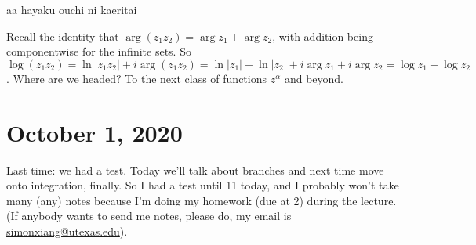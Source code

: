 aa hayaku ouchi ni kaeritai

Recall the identity that $\operatorname{arg}(z_1z_2)=\operatorname{arg}z_1+\operatorname{arg}z_2$, with addition being componentwise for the infinite sets. So $\log (z_1z_2)=\ln |z_1z_2|+i\operatorname{arg}(z_1z_2)=\ln|z_1|+\ln|z_2|+i\operatorname{arg}z_1+i\operatorname{arg}z_2=\log z_1+\log z_2$. 
\orbreak
Where are we headed? To the next class of functions $z^{\alpha }$ and beyond.
\section{October 1, 2020}
Last time: we had a test. Today we'll talk about branches and next time move onto integration, finally. So I had a test until 11 today, and I probably won't take many (any) notes because I'm doing my homework (due at 2) during the lecture. (If anybody wants to send me notes, please do, my email is \url{simonxiang@utexas.edu}).
